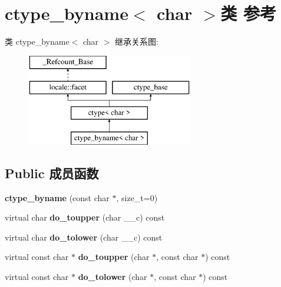 \hypertarget{classctype__byname_3_01char_01_4}{}\section{ctype\+\_\+byname$<$ char $>$类 参考}
\label{classctype__byname_3_01char_01_4}
类 ctype\+\_\+byname$<$ char $>$ 继承关系图\+:\begin{figure}[H]
\begin{center}
\leavevmode
\includegraphics[height=4.000000cm]{classctype__byname_3_01char_01_4}
\end{center}
\end{figure}
\subsection*{Public 成员函数}
\begin{DoxyCompactItemize}
\item 
\mbox{\label{classctype__byname_3_01char_01_4_a6e59030daa4a5b6d8f6248a3cf09f956}} 
{\bfseries ctype\+\_\+byname} (const char $\ast$, size\+\_\+t=0)
\item 
\mbox{\label{classctype__byname_3_01char_01_4_a10691f290e561f4c360f7fc194a7234e}} 
virtual char {\bfseries do\+\_\+toupper} (char \+\_\+\+\_\+c) const
\item 
\mbox{\label{classctype__byname_3_01char_01_4_a2bc3706ac39d37fe98ba963231bd47a9}} 
virtual char {\bfseries do\+\_\+tolower} (char \+\_\+\+\_\+c) const
\item 
\mbox{\label{classctype__byname_3_01char_01_4_ab8212bec170ecbd09c25f21cd07f21a0}} 
virtual const char $\ast$ {\bfseries do\+\_\+toupper} (char $\ast$, const char $\ast$) const
\item 
\mbox{\label{classctype__byname_3_01char_01_4_a6a669ac30238a318468b4c79e91d3d47}} 
virtual const char $\ast$ {\bfseries do\+\_\+tolower} (char $\ast$, const char $\ast$) const
\end{DoxyCompactItemize}
